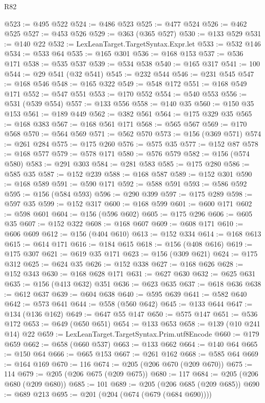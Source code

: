 \begin{lexlean}{R82}
\begin{coremodule}
@523 := @495 @522
@524 := @486 @523
@525 := @477 @524
@526 := @462 @525
@527 := @453 @526
@529 := @363 (@365 @527)
@530 := @133 @529
@531 := @140 @22
@532 := LexLeanTarget.TargetSyntax.Expr.let
@533 := @532 @146
@534 := @533 @64
@535 := @165 @301
@536 := @168 @153
@537 := @536 @171
@538 := @535 @537
@539 := @534 @538
@540 := @165 @317
@541 := 100
@544 := @29 @541 (@32 @541)
@545 := @232 @544
@546 := @231 @545
@547 := @168 @546
@548 := @165 @322
@549 := @548 @172
@551 := @168 @549 @171
@552 := @547 @551
@553 := @170 @552
@554 := @540 @553
@556 := @531 (@539 @554)
@557 := @133 @556
@558 := @140 @35
@560 := @150 @35 @153
@561 := @189 @449
@562 := @382 @561
@564 := @175 @329 @35
@565 := @168 @383
@567 := @168 @561 @171
@568 := @565 @567
@569 := @170 @568
@570 := @564 @569
@571 := @562 @570
@573 := @156 (@369 @571)
@574 := @261 @284
@575 := @175 @260
@576 := @575 @35
@577 := @152 @87
@578 := @168 @577
@579 := @578 @171
@580 := @576 @579
@582 := @156 (@574 @580)
@583 := @291 @303
@584 := @281 @583
@585 := @175 @280
@586 := @585 @35
@587 := @152 @239
@588 := @168 @587
@589 := @152 @301
@590 := @168 @589
@591 := @590 @171
@592 := @588 @591
@593 := @586 @592
@595 := @156 (@584 @593)
@596 := @290 @399
@597 := @175 @289
@598 := @597 @35
@599 := @152 @317
@600 := @168 @599
@601 := @600 @171
@602 := @598 @601
@604 := @156 (@596 @602)
@605 := @175 @296
@606 := @605 @35
@607 := @152 @322
@608 := @168 @607
@609 := @608 @171
@610 := @606 @609
@612 := @156 (@404 @610)
@613 := @152 @334
@614 := @168 @613
@615 := @614 @171
@616 := @184 @615
@618 := @156 (@408 @616)
@619 := @175 @307
@621 := @619 @35 @171
@623 := @156 (@309 @621)
@624 := @175 @312
@625 := @624 @35
@626 := @152 @338
@627 := @168 @626
@628 := @152 @343
@630 := @168 @628 @171
@631 := @627 @630
@632 := @625 @631
@635 := @156 (@413 @632) @351
@636 := @623 @635
@637 := @618 @636
@638 := @612 @637
@639 := @604 @638
@640 := @595 @639
@641 := @582 @640
@642 := @573 @641
@644 := @558 (@560 @642)
@645 := @133 @644
@647 := @134 (@136 @162)
@649 := @647 @55 @147
@650 := @575 @147
@651 := @536 @172
@653 := @649 (@650 @651)
@654 := @133 @653
@658 := @139 (@10 @241 @14) @22
@659 := LexLeanTarget.TargetSyntax.Prim.utf8Encode
@660 := @179 @659
@662 := @658 (@660 @537)
@663 := @133 @662
@664 := @140 @64
@665 := @150 @64
@666 := @665 @153
@667 := @261 @162
@668 := @585 @64
@669 := @164 @169
@670 := 116
@674 := @205 (@206 @670 (@209 @670))
@675 := 114
@679 := @205 (@206 @675 (@209 @675))
@680 := 117
@684 := @205 (@206 @680 (@209 @680))
@685 := 101
@689 := @205 (@206 @685 (@209 @685))
@690 := @689 @213
@695 := @201 (@204 (@674 (@679 (@684 @690))))

\end{coremodule}
\end{lexlean}
